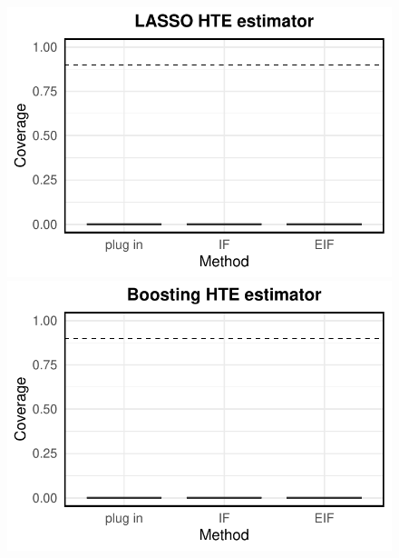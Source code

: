 \documentclass{article}
\theoremstyle{plain}
\theoremstyle{definition}
\theoremstyle{plain}
\begin{document}
\begin{figure}[h]
\begin{minipage}{0.3\textwidth}
                \includegraphics[clip, trim = 0cm 0cm 0cm 0cm, width = \textwidth]{plot/simulation_gradient_boosting_coverage_LASSO.pdf}
        \end{minipage}
        \begin{minipage}{0.3\textwidth}
                \centering
                \includegraphics[clip, trim = 0cm 0cm 0cm 0cm, width = \textwidth]{plot/simulation_gradient_boosting_coverage_Boosting.pdf}
        \end{minipage}
        \begin{minipage}{0.3\textwidth}
                \centering

\end{minipage}
\end{figure}
\end{document}
